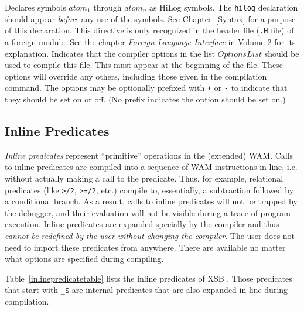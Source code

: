 \begin{description}
	Declares symbols $atom_1$ through $atom_n$ as HiLog symbols.
	The {\tt hilog} declaration should appear {\em before} any use of
	the symbols.  See Chapter~\ref{Syntax} for a purpose of this
 	declaration.
        This directive is only recognized in the header file ({\tt .H} file) 
	of a foreign module. See the chapter {\it Foreign Language
Interface} in Volume 2 for its explanation.
	Indicates that the compiler options in the list $OptionsList$
	should be used to compile this file.  This must appear at the
	beginning of the file.  These options will override any others,
	including those given in the compilation command.  The options
	may be optionally prefixed with \verb|+| or \verb|-| to
	indicate that they should be set on or off.  (No prefix
	indicates the option should be set on.)

\end{description}

\subsection{Inline Predicates}\label{inline_predicates}

{\em Inline predicates} represent ``primitive'' operations in the
(extended) WAM.  Calls to inline predicates are compiled into a
sequence of WAM instructions in-line, i.e. without actually making a
call to the predicate.  Thus, for example, relational predicates (like
{\tt >/2}, {\tt >=/2}, etc.) compile to, essentially, a subtraction
followed by a conditional branch.  As a result, calls to inline
predicates will not be trapped by the debugger, and their evaluation
will not be visible during a trace of program execution.  Inline
predicates are expanded specially by the compiler and thus {\em cannot
  be redefined by the user without changing the compiler}.  The user
does not need to import these predicates from anywhere.  There are
available no matter what options are specified during compiling.

Table~\ref{inlinepredicatetable} lists the inline predicates of
XSB \version.  Those predicates that start with \verb|_$|
are internal predicates that are also expanded in-line during
compilation.

